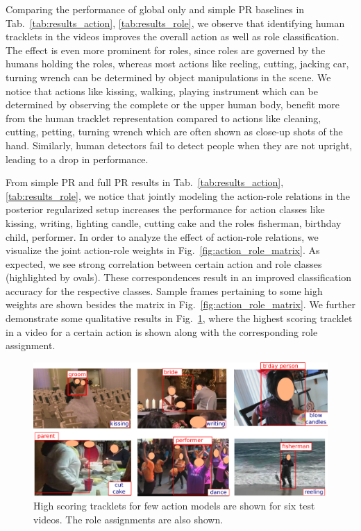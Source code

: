 \documentclass[10pt,twocolumn,letterpaper]{article}
\begin{document}
Comparing the performance of global only and simple PR baselines in Tab.~\ref{tab:results_action}, \ref{tab:results_role}, we observe that identifying human tracklets in the videos improves the overall action as well as role classification. The effect is even more prominent for roles, since roles are governed by the humans holding the roles, whereas most actions like reeling, cutting, jacking car, turning wrench can be determined by object manipulations in the scene. We notice that actions like kissing, walking, playing instrument which can be determined by observing the complete or the upper human body, benefit more from the human tracklet representation compared to actions like cleaning, cutting, petting, turning wrench which are often shown as close-up shots of the hand. Similarly, human detectors fail to detect people when they are not upright, leading to a drop in performance.

From simple PR and full PR results in Tab.~\ref{tab:results_action},
\ref{tab:results_role}, we notice that jointly modeling the action-role
relations in the posterior regularized setup increases the performance for
action classes like kissing, writing, lighting candle, cutting cake and the
roles fisherman, birthday child, performer. In order to analyze the effect of
action-role relations, we visualize the joint action-role weights in
Fig.~\ref{fig:action_role_matrix}. As expected, we see strong correlation
between certain action and role classes (highlighted by ovals). These
correspondences result in an improved classification accuracy for the
respective classes. Sample frames pertaining to some high weights are shown
besides the matrix in Fig.~\ref{fig:action_role_matrix}. We further demonstrate
some qualitative results in Fig.~\ref{fig:actionRoleSamples}, where the highest
scoring tracklet in a video for a certain action is shown along with the
corresponding role assignment.

\begin{figure}[ht]
\centering
   \includegraphics[scale = 0.2]{../images/actionRoleSamples.pdf}
      \caption{High scoring tracklets for few action models are shown for six test videos. The role assignments are also shown.}
\label{fig:actionRoleSamples}
\end{figure}
\vspace*{-5pt}
\end{document}
